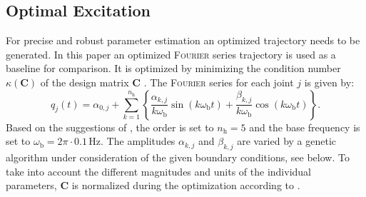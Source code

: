 
\subsection{Optimal Excitation}
\label{subsec:OptimalExcitation}

For precise and robust parameter estimation an optimized trajectory needs to be generated. In this paper an optimized \textsc{Fourier} series trajectory is used as a baseline for comparison. It is optimized by minimizing the condition number $\kappa(\boldsymbol{C})$ of the design matrix $\boldsymbol{C}$ \cite{Bona.2005,Kostic.2004,Olsen.2002,Swevers.1997}.
The \textsc{Fourier} series for each joint $j$ is given by:
\begin{equation} 
\label{eq:fourier_series}
q_j(t) = \alpha_{0,j} + \sum \limits_{k=1}^{n_\mathrm{h}} \left\{ \frac{\alpha_{k,j}}{k \omega_\mathrm{b}} \sin(k \omega_\mathrm{b} t) + \frac{\beta_{k,j}}{k \omega_\mathrm{b}} \cos(k \omega_\mathrm{b} t) \right\}.
\end{equation}
Based on the suggestions of \cite{Swevers.1997,Bona.2005}, the order is set to $n_\mathrm{h}=5$ and the base frequency is set to $\omega_\mathrm{b}=2\pi \cdot 0.1\,\mathrm{Hz}$. The amplitudes $\alpha_{k,j}$ and $\beta_{k,j}$ are varied by a genetic algorithm under consideration of the given boundary conditions, see below.
To take into account the different magnitudes and units of the individual parameters, $\boldsymbol{C}$ is normalized during the optimization according to \cite{Sun.2008}.

